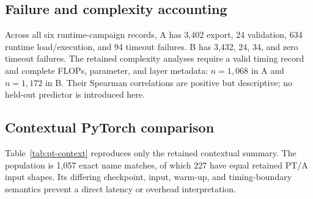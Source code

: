 \begin{table}[t]
\centering
\caption{Architecture-associated P2 strict runtime success. Flags overlap; Wilson intervals are 95\% intervals.}
\label{tab:architecture-full}
\scriptsize
{}
\end{table}

\subsection{Failure and complexity accounting}
Across all six runtime-campaign records, A has 3,402 export, 24 validation, 634 runtime load/execution, and 94 timeout failures. B has 3,432, 24, 34, and zero timeout failures. The retained complexity analyses require a valid timing record and complete FLOPs, parameter, and layer metadata: $n=1{,}068$ in A and $n=1{,}172$ in B. Their Spearman correlations are positive but descriptive; no held-out predictor is introduced here.

\subsection{Contextual PyTorch comparison}
Table~\ref{tab:pt-context} reproduces only the retained contextual summary. The population is 1,057 exact name matches, of which 227 have equal retained PT/A input shapes. Its differing checkpoint, input, warm-up, and timing-boundary semantics prevent a direct latency or overhead interpretation.

